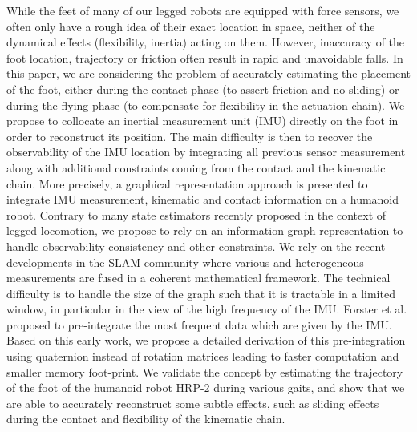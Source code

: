 While the feet of many of our legged robots are equipped with force sensors, we often only have a rough idea of their exact location in space, neither of the dynamical effects (flexibility, inertia) acting on them.
However, inaccuracy of the foot location, trajectory or friction often result in rapid and unavoidable falls.
In this paper, we are considering the problem of accurately estimating the placement of the foot, either during the contact phase (to assert friction and no sliding) or during the flying phase (to compensate for flexibility in the actuation chain).
We propose to collocate an inertial measurement unit (IMU) directly on the foot in order to reconstruct its position.
The main difficulty is then to recover the observability of the IMU location by integrating all previous sensor measurement along with additional constraints coming from the contact and the kinematic chain.
More precisely, a graphical representation approach is presented to integrate IMU measurement, kinematic and contact information on a humanoid robot. 
Contrary to many state estimators recently proposed in the context of legged locomotion, we propose to rely on an information graph representation to handle observability consistency and other constraints.
We rely on the recent developments in the SLAM community where various and heterogeneous measurements are fused in a coherent mathematical framework.
The technical difficulty is to handle the size of the graph such that it is tractable in a limited window, in particular in the view of the high frequency of the IMU.
Forster et al. proposed to pre-integrate the most frequent data which are given by the IMU.
Based on this early work, we propose a detailed derivation of this pre-integration using quaternion instead of rotation matrices leading to faster computation and smaller memory foot-print.
We validate the concept by estimating the trajectory of the foot of the humanoid robot HRP-2 during various gaits, and show that we are able to accurately reconstruct some subtle effects, such as sliding effects during the contact and flexibility of the kinematic chain.
